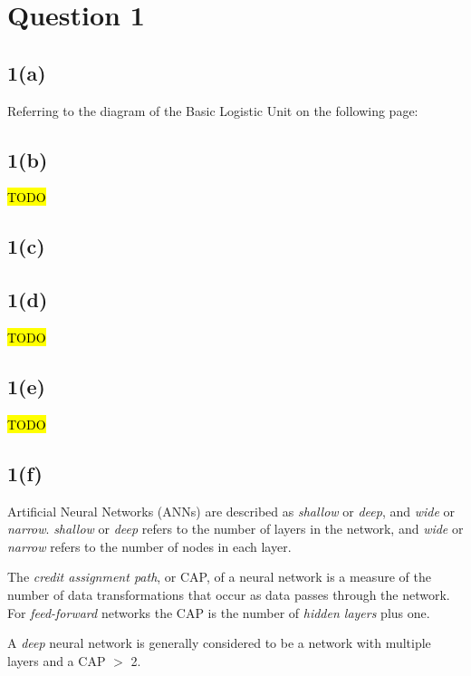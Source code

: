 \documentclass[12pt, a4paper,reqno]{article}
\begin{document}



%
%
\section*{Question 1}

\subsection*{1(a)}
Referring to the diagram of the Basic Logistic Unit on the following page:



\subsection*{1(b)}
\hl{TODO}

\subsection*{1(c)}


\subsection*{1(d)}
\hl{TODO}

\subsection*{1(e)}
\hl{TODO}

\subsection*{1(f)}
Artificial Neural Networks (ANNs) are described as \emph{shallow} or \emph{deep}, and \emph{wide} or \emph{narrow}. \emph{shallow} or \emph{deep} refers to the number of layers in the network, and \emph{wide} or \emph{narrow} refers to the number of nodes in each layer.

The \emph{credit assignment path}, or CAP, of a neural network is a measure of the number of data transformations that occur as data passes through the network. For \emph{feed-forward} networks the CAP is the number of \emph{hidden layers} plus one.

A \emph{deep} neural network is generally considered to be a network with multiple layers and a CAP $>$ 2.
\end{document}

